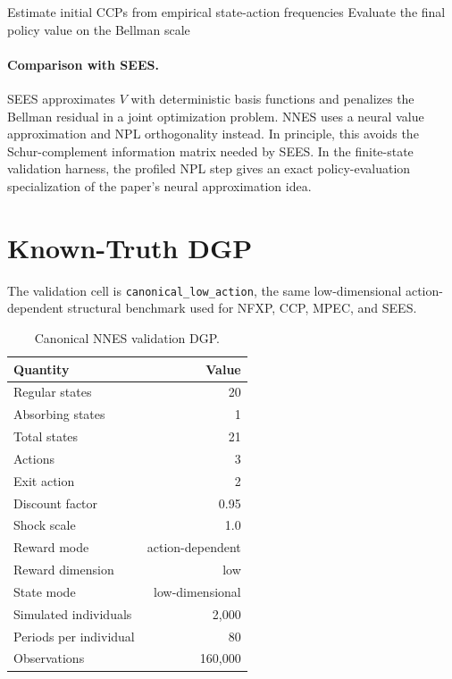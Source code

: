 \documentclass[10pt]{article}
\begin{document}
\begin{algorithm}[H]
\DontPrintSemicolon
\caption{NNES with NPL value regression}
Estimate initial CCPs from empirical state-action frequencies\;
Evaluate the final policy value on the Bellman scale\;
\end{algorithm}

\paragraph{Comparison with SEES.}
SEES \citep{luoSang2024} approximates \(V\) with deterministic basis functions
and penalizes the Bellman residual in a joint optimization problem. NNES uses a
neural value approximation and NPL orthogonality instead. In principle, this
avoids the Schur-complement information matrix needed by SEES. In the
finite-state validation harness, the profiled NPL step gives an exact
policy-evaluation specialization of the paper's neural approximation idea.

\section{Known-Truth DGP}

The validation cell is \texttt{canonical\_low\_action}, the same
low-dimensional action-dependent structural benchmark used for NFXP, CCP,
MPEC, and SEES.

\begin{table}[H]
\centering\small
\caption{Canonical NNES validation DGP.}
\begin{tabular}{lr}
\toprule
Quantity & Value \\
\midrule
Regular states & 20 \\
Absorbing states & 1 \\
Total states & 21 \\
Actions & 3 \\
Exit action & 2 \\
Discount factor & 0.95 \\
Shock scale & 1.0 \\
Reward mode & action-dependent \\
Reward dimension & low \\
State mode & low-dimensional \\
Simulated individuals & 2,000 \\
Periods per individual & 80 \\
Observations & 160,000 \\
\bottomrule
\end{tabular}
\end{table}
\end{document}
